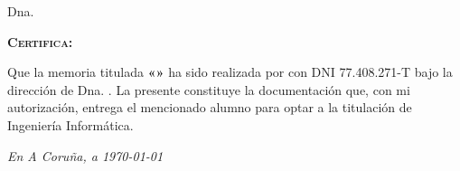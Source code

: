 %
%
\begin{minipage}[t][6cm][l]{\textwidth}
\vspace{6cm}

Dna. \textsc{\PfcDirector}
\end{minipage}

\vspace{1.5cm}
\textsc{\textbf{Certifica:}}
\vspace{1.5cm}

Que la memoria titulada \textbf{«\PfcTitle»} ha sido realizada por
\textsc{\PfcAuthor} con DNI 77.408.271-T bajo la dirección de Dna.
\textsc{\PfcDirector}. La presente constituye la documentación que,
con mi autorización, entrega el mencionado alumno para optar a la
titulación de Ingeniería Informática.

\vfill

\begin{flushright}
	\textit{En A Coruña, a \today}
\end{flushright}
